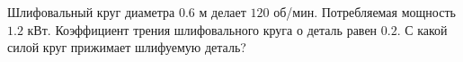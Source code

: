 Шлифовальный круг диаметра $0.6$ м делает $120$ об/мин. Потребляемая
мощность $1.2$ кВт. Коэффициент трения шлифовального круга о деталь
равен $0.2$. С какой силой круг прижимает шлифуемую деталь?
